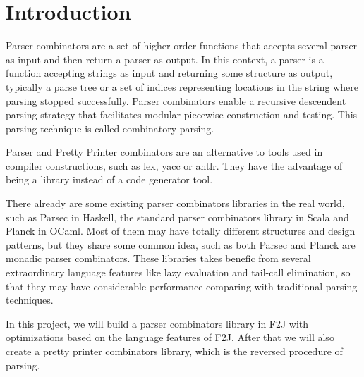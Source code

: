 \chapter{Introduction}

Parser combinators are a set of higher-order functions that accepts several parser as input and then return a parser as output. In this context, a parser is a function accepting strings as input and returning some structure as output, typically a parse tree or a set of indices representing locations in the string where parsing stopped successfully. Parser combinators enable a recursive descendent parsing strategy that facilitates modular piecewise construction and testing. This parsing technique is called combinatory parsing.

Parser and Pretty Printer combinators are an alternative to tools used in compiler constructions, such as lex, yacc or antlr. They have the advantage of being a library instead of a code generator tool.

There already are some existing parser combinators libraries in the real world, such as Parsec \cite{Leijen:2002} in Haskell, the standard parser combinators library in Scala and Planck \cite{Planck} in OCaml. Most of them may have totally different structures and design patterns, but they share some common idea, such as both Parsec and Planck are monadic parser combinators. These libraries takes benefic from several extraordinary language features like lazy evaluation and tail-call elimination, so that they may have considerable performance comparing with traditional parsing techniques.

In this project, we will build a parser combinators library in F2J with optimizations based on the language features of F2J. After that we will also create a pretty printer combinators library, which is the reversed procedure of parsing.
